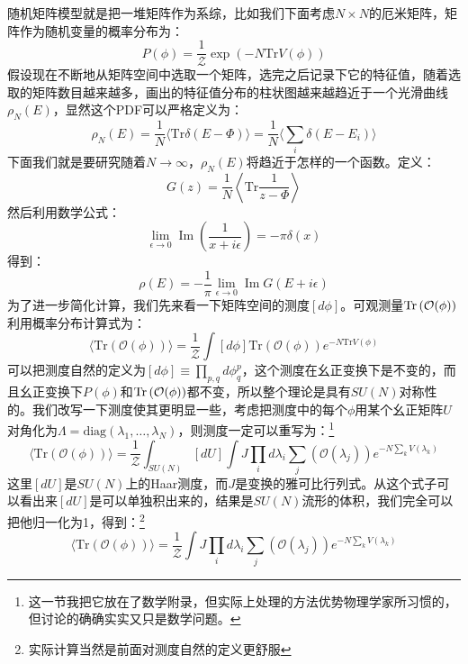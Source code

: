 随机矩阵模型就是把一堆矩阵作为系综，比如我们下面考虑$N\times N$的厄米矩阵，矩阵作为随机变量的概率分布为：
\begin{equation}
	P(\phi)=\frac1{\mathcal{Z}}\exp{(-N\text{Tr}V(\phi))}
\end{equation}
假设现在不断地从矩阵空间中选取一个矩阵，选完之后记录下它的特征值，随着选取的矩阵数目越来越多，画出的特征值分布的柱状图越来越趋近于一个光滑曲线$\rho_N(E)$，显然这个PDF可以严格定义为：
\begin{equation}
	\rho_N(E)=\frac1N\langle\text{Tr}\delta(E-\Phi)\rangle=\frac1N\langle\sum_i\delta(E-E_i)\rangle 
\end{equation}
下面我们就是要研究随着$N\to\infty$，$\rho_N(E)$将趋近于怎样的一个函数。定义：
\begin{equation}
	G(z)=\frac1N\left\langle\text{Tr}\frac1{z-\Phi} \right\rangle
\end{equation}
然后利用数学公式：
\begin{equation}
	\operatorname*{lim}_{\epsilon\to0}\operatorname{Im}(\frac{1}{x+i\epsilon})=-\pi\delta(x)
\end{equation}
得到：
\begin{equation}
	\rho(E)=-\frac 1\pi\lim_{\epsilon\to0}\operatorname{Im}G(E+i\epsilon)
\end{equation}
为了进一步简化计算，我们先来看一下矩阵空间的测度$[d\phi]$。可观测量$\Tr\left(\mathcal{O}(\phi)\right)$利用概率分布计算式为：
\begin{equation}
	\langle\mathrm{Tr}(\mathcal{O}(\phi))\rangle=\frac1{\mathcal{Z}}\int[d\phi]\mathrm{Tr}(\mathcal{O}(\phi))e^{-N\mathrm{Tr}V(\phi)}
\end{equation}
可以把测度自然的定义为$[d\phi]\equiv\prod_{p,q}d\phi^p_q$，这个测度在幺正变换下是不变的，而且幺正变换下$P(\phi)$和$\Tr\left(\mathcal{O}(\phi)\right)$都不变，所以整个理论是具有$SU(N)$对称性的。我们改写一下测度使其更明显一些，考虑把测度中的每个$\phi$用某个幺正矩阵$U$对角化为$\Lambda=\mathrm{diag}(\lambda_1,\ldots,\lambda_N)$，则测度一定可以重写为：\footnote{这一节我把它放在了数学附录，但实际上处理的方法优势物理学家所习惯的，但讨论的确确实实又只是数学问题。}
\begin{equation}
	\langle\mathrm{Tr}(\mathcal{O}(\phi))\rangle=\frac1{\mathcal{Z}}\int_{SU(N)}[dU]\int J\prod_id\lambda_i\sum_j(\mathcal{O}(\lambda_j))e^{-N\sum_kV(\lambda_k)}
\end{equation}
这里$[dU]$是$SU(N)$上的Haar测度，而$J$是变换的雅可比行列式。从这个式子可以看出来$[dU]$是可以单独积出来的，结果是$SU(N)$流形的体积，我们完全可以把他归一化为1，得到：\footnote{实际计算当然是前面对测度自然的定义更舒服}
\begin{equation}\label{B.47}
	\langle\mathrm{Tr}(\mathcal{O}(\phi))\rangle=\frac1{\mathcal{Z}}\int J\prod_id\lambda_i\sum_j(\mathcal{O}(\lambda_j))e^{-N\sum_kV(\lambda_k)}
\end{equation}

